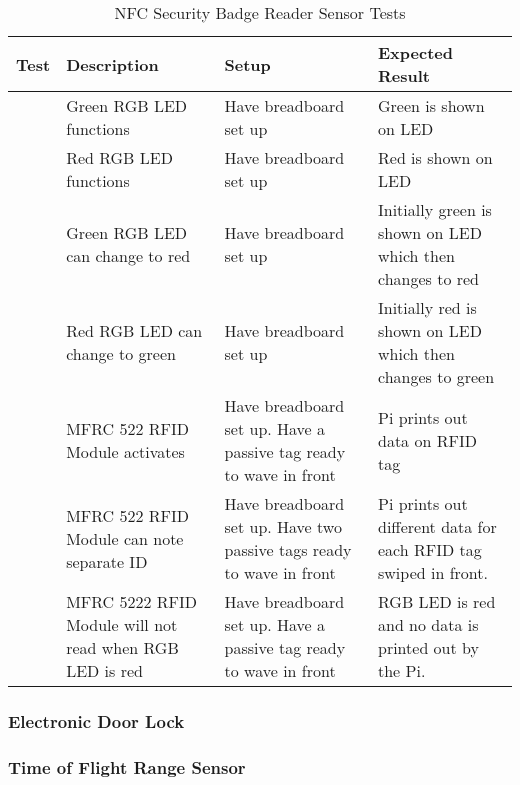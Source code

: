 \begin{table*}[htb]
\centering
\begin{tabular}{>{\centering\arraybackslash}m{0.75cm}|>{\centering\arraybackslash}m{4cm}|>{\centering\arraybackslash}m{4.5cm}|>{\centering\arraybackslash}m{4cm}}
\toprule
Test & Description & Setup & Expected Result \\
\midrule
1 & Green RGB LED functions & Have breadboard set up & Green is shown on LED \\
\hline
2 & Red RGB LED functions & Have breadboard set up & Red is shown on LED \\
\hline
3 & Green RGB LED can change to red & Have breadboard set up & Initially green
is shown on LED which then changes to red \\
\hline
4 & Red RGB LED can change to green & Have breadboard set up & Initially red is
shown on LED which then changes to green \\
\hline
5 & MFRC 522 RFID Module activates & Have breadboard set up. Have a passive tag
ready to wave in front & Pi prints out data on RFID tag \\
\hline
6 & MFRC 522 RFID Module can note separate ID & Have breadboard set up. Have two
passive tags ready to wave in front & Pi prints out different data for each RFID
tag swiped in front. \\
\hline
7 & MFRC 5222 RFID Module will not read when RGB LED is red & Have breadboard
set up. Have a passive tag ready to wave in front & RGB LED is red and no data
is printed out by the Pi. \\
\bottomrule
\end{tabular}
\caption{NFC Security Badge Reader Sensor Tests}
\label{table:nfc-tests}
\end{table*}

\subsubsection{Electronic Door Lock}

\subsubsection{Time of Flight Range Sensor}

